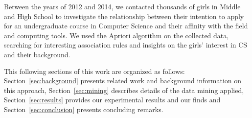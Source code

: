 
%

Between the years of 2012 and 2014, we contacted thousands of girls in Middle and High School to investigate the relationship between their intention to apply for an undergraduate course in Computer Science and their affinity with the field and computing tools. We used the Apriori algorithm on the collected data, searching for interesting association rules and insights on the girls' interest in CS and their background.

This following sections of this work are organized as follows: Section~\ref{sec:background} presents related work and background information on this approach, Section~\ref{sec:mining} describes details of the data mining applied, Section~\ref{sec:results} provides our experimental results and our finds and Section~\ref{sec:conclusion} presents concluding remarks.
